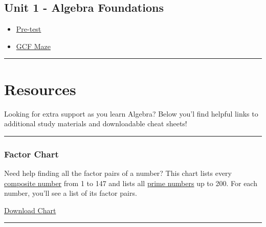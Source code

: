 \documentclass[
  letterpaper,
  DIV=11,
  numbers=noendperiod]{scrreprt}
\providecommand{\tightlist}{%
  \setlength{\itemsep}{0pt}\setlength{\parskip}{0pt}}
\begin{document}
\section*{Unit 1 - Algebra
Foundations}\label{unit-1---algebra-foundations}


\begin{itemize}
\tightlist
\item
  \href{Unit_1/Unit_1_Pretest.pdf}{Pre-test}
\item
  \href{Unit_1/gcf_maze.pdf}{GCF Maze}
\end{itemize}

\begin{center}\rule{0.5\linewidth}{0.5pt}\end{center}


\chapter*{Resources}\label{resources}


Looking for extra support as you learn Algebra? Below you'l find helpful
links to additional study materials and downloadable cheat sheets!

\begin{center}\rule{0.5\linewidth}{0.5pt}\end{center}

\subsection*{Factor Chart}\label{factor-chart}

Need help finding all the factor pairs of a number? This chart lists
every
\href{./glossary.html\#glossary-composite-number}{composite number} from
1 to 147 and lists all
\href{./glossary.html\#glossary-prime-number}{prime numbers} up to 200.
For each number, you'll see a list of its factor pairs.

\href{./resources/Factor-Chart_noprimes.pdf}{Download Chart}

\begin{center}\rule{0.5\linewidth}{0.5pt}\end{center}
\end{document}
